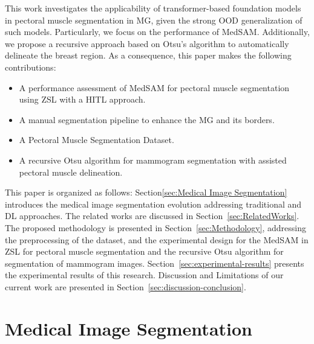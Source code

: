 \documentclass[runningheads]{llncs}
\begin{document}
This work investigates the applicability of transformer-based
foundation models in pectoral muscle segmentation in \ac{MG}, given
the strong \ac{OOD} generalization of such models. Particularly, we
focus on the performance of \ac{MedSAM}. Additionally, we propose a
recursive approach based on Otsu's algorithm to automatically
delineate the breast region. As a consequence, this paper makes the
following contributions:
\begin{itemize}
\item A performance assessment of \ac{MedSAM} for pectoral muscle
  segmentation using \ac{ZSL} with a \ac{HITL} approach.
\item A manual segmentation pipeline to enhance the \ac{MG} and its
  borders.
\item A Pectoral Muscle Segmentation Dataset.
\item A recursive Otsu algorithm for mammogram segmentation with
  assisted pectoral muscle delineation.
\end{itemize}


This paper is organized as follows: Section\ref{sec:Medical Image
  Segmentation} introduces the medical image segmentation evolution
addressing traditional and \ac{DL} approaches. The related works are
discussed in Section~\ref{sec:RelatedWorks}. The proposed methodology
is presented in Section~\ref{sec:Methodology}, addressing the
preprocessing of the dataset, and the experimental design for the
\ac{MedSAM} in \ac{ZSL} for pectoral muscle segmentation and the
recursive Otsu algorithm for segmentation of mammogram
images. Section~\ref{sec:experimental-results} presents the
experimental results of this research. Discussion and Limitations of
our current work are presented in Section~\ref{sec:discussion-conclusion}. %

\section{Medical Image Segmentation}\label{sec:Medical Image Segmentation}

\end{document}
